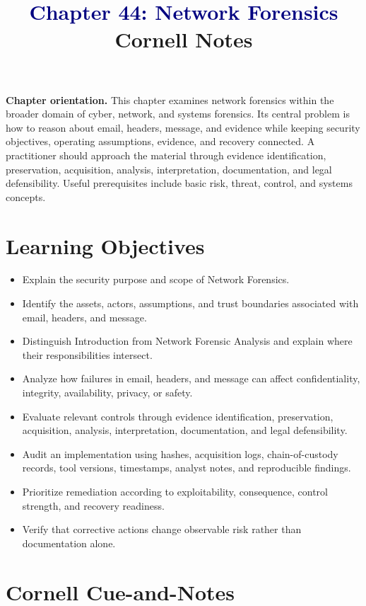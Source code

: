 \documentclass[11pt]{article}
\title{\textcolor{Navy}{Chapter 44: Network Forensics}\\[2mm]\large Cornell Notes}
\author{}
\date{}
\begin{document}
\maketitle
\thispagestyle{fancy}
\vspace{-1.5em}
\begin{orientationbox}
\textbf{Chapter orientation.} This chapter examines network forensics within the broader domain of cyber, network, and systems forensics. Its central problem is how to reason about email, headers, message, and evidence while keeping security objectives, operating assumptions, evidence, and recovery connected. A practitioner should approach the material through evidence identification, preservation, acquisition, analysis, interpretation, documentation, and legal defensibility. Useful prerequisites include basic risk, threat, control, and systems concepts.
\end{orientationbox}
\section*{Learning Objectives}
\begin{itemize}
\item Explain the security purpose and scope of Network Forensics.
\item Identify the assets, actors, assumptions, and trust boundaries associated with email, headers, and message.
\item Distinguish Introduction from Network Forensic Analysis and explain where their responsibilities intersect.
\item Analyze how failures in email, headers, and message can affect confidentiality, integrity, availability, privacy, or safety.
\item Evaluate relevant controls through evidence identification, preservation, acquisition, analysis, interpretation, documentation, and legal defensibility.
\item Audit an implementation using hashes, acquisition logs, chain-of-custody records, tool versions, timestamps, analyst notes, and reproducible findings.
\item Prioritize remediation according to exploitability, consequence, control strength, and recovery readiness.
\item Verify that corrective actions change observable risk rather than documentation alone.
\end{itemize}
\section*{Cornell Cue-and-Notes}
\end{document}
